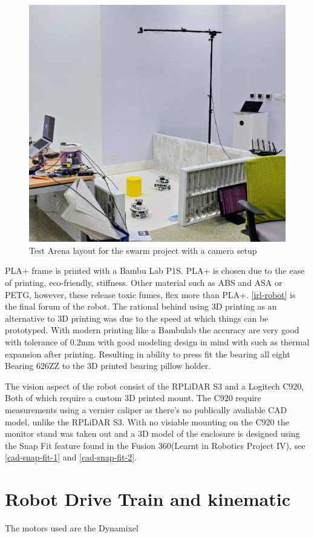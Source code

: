 \begin{figure}
    \centering
    \includegraphics[width=0.65\linewidth]{assets/images/hardware/room-layout.jpg}
    \caption{Test Arena layout for the swarm project with a camera setup}
    \label{fig:have2robots}
\end{figure}

PLA+ frame is printed with a Bambu Lab P1S. PLA+ is chosen due to the ease of printing, eco-friendly, stiffness. Other material such as ABS and ASA or PETG, however, these release toxic fumes, flex more than PLA+. \ref{irl-robot} is the final forum of the robot. The rational behind using 3D printing as an alternative to 3D printing was due to the speed at which things can be prototyped. With modern printing like a Bambulab the accuracy are very good with tolerance of 0.2mm with good modeling design in mind with such as thermal expansion after printing. Resulting in ability to press fit the bearing all eight Bearing 626ZZ to the 3D printed bearing pillow holder. 

The vision aspect of the robot consist of the RPLiDAR S3 and a Logitech C920, Both of which require a custom 3D printed mount. 
The C920 require measurements using a vernier caliper as there's no publically avaliable CAD model, unlike the RPLiDAR S3. With no visiable mounting on the C920 the monitor stand was taken out and a 3D model of the enclosure is designed using the Snap Fit feature found in the Fusion 360(Learnt in Robotics Project IV), see \ref{cad-snap-fit-1} and \ref{cad-snap-fit-2}. 

\section{Robot Drive Train and kinematic}
The motors used are the Dynamixel 


